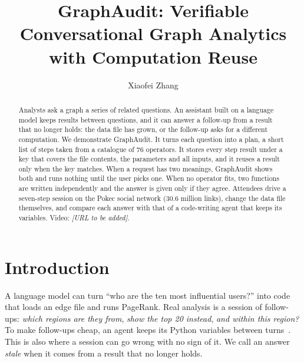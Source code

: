 \documentclass[sigconf,9pt]{acmart}
\newcommand{\sys}{GraphAudit}
\begin{document}
\title{GraphAudit: Verifiable Conversational Graph Analytics with Computation Reuse}

\author{Xiaofei Zhang}

\begin{abstract}
Analysts ask a graph a series of related questions. An assistant built on a language model keeps results
between questions, and it can answer a follow-up from a result that no longer holds: the data file has
grown, or the follow-up asks for a different computation. We demonstrate \sys{}. It turns each question
into a plan, a short list of steps taken from a catalogue of 76 operators. It stores every step
result under a key that covers the file contents, the parameters and all inputs, and it reuses a result
only when the key matches. When a request has two meanings, \sys{} shows both and runs nothing until the
user picks one. When no operator fits, two functions are written independently and the answer is given only if they agree. Attendees drive a seven-step session on the Pokec social network (30.6 million
links), change the data file themselves, and compare each answer with that of a code-writing agent that
keeps its variables.
Video: \emph{[URL to be added]}.
\end{abstract}


\maketitle

\section{Introduction}

A language model can turn ``who are the ten most influential users?'' into code that loads an edge file and
runs PageRank. Real analysis is a session of follow-ups: \emph{which regions are they from}, \emph{show the
top 20 instead}, \emph{and within this region?} To make follow-ups cheap, an agent keeps its Python
variables between turns~\cite{codeact}. This is also where a session can go wrong with no sign of it. We
call an answer \emph{stale} when it comes from a result that no longer holds.
\end{document}
